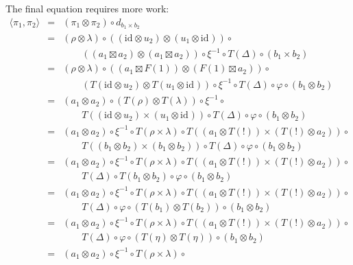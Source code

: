 \documentclass{LMCS}
\newcommand{\after}{\mathrel{\circ}}
\newcommand{\idmap}[1][]{\ensuremath{\mathrm{id}_{#1}}}
\newcommand{\tuple}[1]{\ensuremath{\langle #1 \rangle}}
\begin{document}
{The final equation requires more work:
$$\begin{array}{rcl}
\tuple{\pi_{1}, \pi_{2}}
& = &
(\pi_{1}\otimes\pi_{2}) \after d_{b_{1}\times b_{2}} \\
& = &
(\rho\otimes\lambda) \after 
   ((\idmap\otimes u_{2}) \otimes (u_{1} \otimes \idmap)) \after \\
& & \qquad
   ((a_{1}\boxtimes a_{2}) \otimes (a_{1} \boxtimes a_{2})) \after
   \xi^{-1} \after T(\Delta) \after (b_{1}\times b_{2}) \\
& = &
(\rho\otimes\lambda) \after 
   ((a_{1}\boxtimes F(1)) \otimes (F(1) \boxtimes a_{2})) \after \\
& & \qquad
   (T(\idmap\otimes u_{2}) \otimes T(u_{1} \otimes \idmap)) \after 
   \xi^{-1} \after T(\Delta) \after \varphi \after (b_{1}\otimes b_{2}) \\
& = &
(a_{1}\otimes a_{2}) \after (T(\rho)\otimes T(\lambda)) \after \xi^{-1} \after \\
& & \qquad
   T((\idmap\otimes u_{2}) \times (u_{1} \otimes \idmap)) \after 
   T(\Delta) \after \varphi \after (b_{1}\otimes b_{2}) \\
& = &
(a_{1}\otimes a_{2}) \after \xi^{-1} \after T(\rho\times \lambda) \after
   T((a_{1}\otimes T(!)) \times (T(!) \otimes a_{2})) \after \\
& & \qquad
   T((b_{1}\otimes b_{2}) \times (b_{1}\otimes b_{2})) \after 
   T(\Delta) \after \varphi \after (b_{1}\otimes b_{2}) \\
& = &
(a_{1}\otimes a_{2}) \after \xi^{-1} \after T(\rho\times \lambda) \after
   T((a_{1}\otimes T(!)) \times (T(!) \otimes a_{2})) \after \\
& & \qquad
   T(\Delta) \after T(b_{1}\otimes b_{2}) \after 
   \varphi \after (b_{1}\otimes b_{2}) \\
& = &
(a_{1}\otimes a_{2}) \after \xi^{-1} \after T(\rho\times \lambda) \after
   T((a_{1}\otimes T(!)) \times (T(!) \otimes a_{2})) \after \\
& & \qquad
   T(\Delta) \after \varphi \after (T(b_{1}) \otimes T(b_{2})) \after 
   (b_{1}\otimes b_{2}) \\
& = &
(a_{1}\otimes a_{2}) \after \xi^{-1} \after T(\rho\times \lambda) \after
   T((a_{1}\otimes T(!)) \times (T(!) \otimes a_{2})) \after \\
& & \qquad
   T(\Delta) \after \varphi \after (T(\eta) \otimes T(\eta)) \after 
   (b_{1}\otimes b_{2}) \\
& = &
(a_{1}\otimes a_{2}) \after \xi^{-1} \after T(\rho\times \lambda) \after

\end{array}$$}
\end{document}
